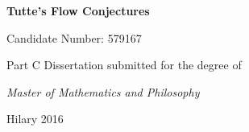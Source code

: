 \thispagestyle{empty}
\vfill
\begin{center}
{\Huge \bfseries
	Tutte's Flow Conjectures
} \par
      
\large 
\vspace*{30mm} 
\logo \par
\vspace*{30mm}
Candidate Number: 579167 \par
\vspace*{8ex}   
Part C Dissertation submitted for the degree of \par
\vspace*{1ex}
\textit{Master of Mathematics and Philosophy} \par
\vspace*{16ex}
Hilary 2016
  \end{center}
\vfill